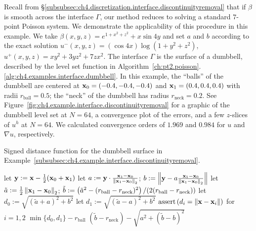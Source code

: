 Recall from \S\ref{subsubsec:ch4.discretization.interface.discontinuityremoval} that if $\beta$ is smooth across the interface $\Gamma$, our method reduces to solving a standard $7$-point Poisson system. We demonstrate the applicability of this procedure in this example. We take $\beta(x,y,z) = e^{1 + x^2 + z^2} + x \sin 4y$ and set $a$ and $b$ according to the exact solution $u^-(x,y,z) = (\cos 4x) \log(1 + y^2 + z^2)$, $u^+(x,y,z) = x y^2 + 3 y z^2 + 7 z x^2$. The interface $\Gamma$ is the surface of a dumbbell, described by the level set function in Algorithm~\ref{ch:pt2.poisson}.\ref{alg:ch4.examples.interface.dumbbell}. In this example, the ``balls'' of the dumbbell are centered at $\mathbf{x}_0 = (-0.4,-0.4,-0.4)$ and $\mathbf{x}_1 = (0.4,0.4,0.4)$ with radii $r_{\text{ball}} = 0.5$; the ``neck'' of the dumbbell has radius $r_{\text{neck}} = 0.2$. See Figure~\ref{fig:ch4.example.interface.discontinuityremoval} for a graphic of the dumbbell level set at $N = 64$, a convergence plot of the errors, and a few $z$-slices of $u^h$ at $N = 64$. We calculated convergence orders of $1.969$ and $0.984$ for $u$ and $\nabla u$, respectively.

\begin{algorithm}[htbp]
\caption{Signed distance function for the dumbbell surface in Example~\ref{subsubsec:ch4.example.interface.discontinuityremoval}.}
\label{alg:ch4.examples.interface.dumbbell}
\begin{algorithmic}[1]
\STATE {}
\STATE {}
\STATE let $\mathbf{y} := \mathbf{x} - \frac{1}{2} (\mathbf{x}_0 + \mathbf{x}_1)$
\STATE {}
\STATE let $a := \mathbf{y} \cdot \frac{\mathbf{x}_1 - \mathbf{x}_0}{\left\lVert \mathbf{x}_1 - \mathbf{x}_0 \right\rVert_2}$; $b := \left\lVert \mathbf{y} - a \frac{\mathbf{x}_1 - \mathbf{x}_0}{\left\lVert \mathbf{x}_1 - \mathbf{x}_0 \right\rVert_2} \right\rVert$
\STATE let $\tilde{a} := \frac{1}{2} \left\lVert \mathbf{x}_1 - \mathbf{x}_0 \right\rVert_2$; $\tilde{b} := \left( \tilde{a}^2 - (r_{\text{ball}} - r_{\text{neck}})^2 \right) / (2 (r_{\text{ball}} - r_{\text{neck}}))$
    \STATE let $d_0 := \sqrt{(\tilde{a} + a)^2 + b^2}$ 
    \STATE let $d_1 := \sqrt{(\tilde{a} - a)^2 + b^2}$ 
    \STATE $\operatorname{assert} \left( d_i = \left\lVert \mathbf{x} - \mathbf{x}_i \right\rVert \right)$ for $i = 1,2$
    \RETURN $\min \{d_0, d_1\} - r_{\text{ball}}$
\ELSE
    \RETURN $(\tilde{b} - r_{\text{neck}}) - \sqrt{a^2 + (\tilde{b} - b)^2}$
\ENDIF
\end{algorithmic}
\end{algorithm}

